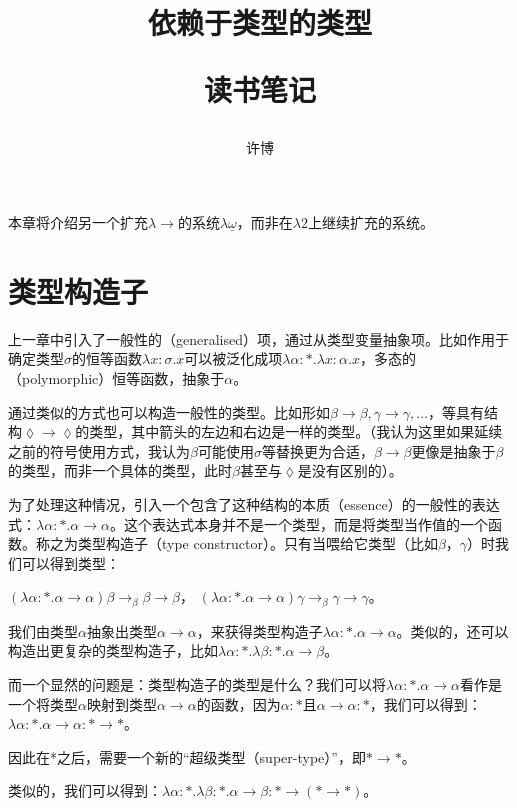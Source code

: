 \documentclass[UTF8]{article}
\title{依赖于类型的类型\\[2ex]\begin{large}读书笔记\end{large}}
\author{许博}
\date{}
\begin{document}
\maketitle
		\noindent
		本章将介绍另一个扩充$\lambda{\rightarrow}$的系统$\lambda{\underline{\omega}}$，而非在$\lambda{2}$上继续扩充的系统。

	\section{类型构造子}
		\noindent
		上一章中引入了一般性的（generalised）项，通过从类型变量抽象项。比如作用于确定类型$\sigma$的恒等函数$\lambda x:\sigma.x$可以被泛化成项$\lambda\alpha:*.\lambda x:\alpha.x$，多态的（polymorphic）恒等函数，抽象于$\alpha$。
		
		通过类似的方式也可以构造一般性的类型。比如形如$\beta\rightarrow\beta,\gamma\rightarrow\gamma,...$，等具有结构$\lozenge\rightarrow\lozenge$的类型，其中箭头的左边和右边是一样的类型。（我认为这里如果延续之前的符号使用方式，我认为$\beta$可能使用$\sigma$等替换更为合适，$\beta\rightarrow\beta$更像是抽象于$\beta$的类型，而非一个具体的类型，此时$\beta$甚至与$\lozenge$是没有区别的）。
		
		为了处理这种情况，引入一个包含了这种结构的本质（essence）的一般性的表达式：$\lambda\alpha:*.\alpha\rightarrow\alpha$。这个表达式本身并不是一个类型，而是将类型当作值的一个函数。称之为类型构造子（type constructor）。只有当喂给它类型（比如$\beta$，$\gamma$）时我们可以得到类型：
		
		$(\lambda\alpha:*.\alpha\rightarrow\alpha)\beta\rightarrow_\beta\beta\rightarrow\beta$，
		$(\lambda\alpha:*.\alpha\rightarrow\alpha)\gamma\rightarrow_\beta\gamma\rightarrow\gamma$。
		
		我们由类型$\alpha$抽象出类型$\alpha\rightarrow\alpha$，来获得类型构造子$\lambda\alpha:*.\alpha\rightarrow\alpha$。类似的，还可以构造出更复杂的类型构造子，比如$\lambda\alpha:*.\lambda\beta:*.\alpha\rightarrow\beta$。
		
		而一个显然的问题是：类型构造子的类型是什么？我们可以将$\lambda\alpha:*.\alpha\rightarrow\alpha$看作是一个将类型$\alpha$映射到类型$\alpha\rightarrow\alpha$的函数，因为$\alpha:*$且$\alpha\rightarrow\alpha:*$，我们可以得到：$\lambda\alpha:*.\alpha\rightarrow\alpha:*\rightarrow*$。
		
		因此在*之后，需要一个新的“超级类型（super-type）”，即$*\rightarrow*$。
		
		类似的，我们可以得到：$\lambda\alpha:*.\lambda\beta:*.\alpha\rightarrow\beta:*\rightarrow(*\rightarrow*)$。
		
\end{document}
